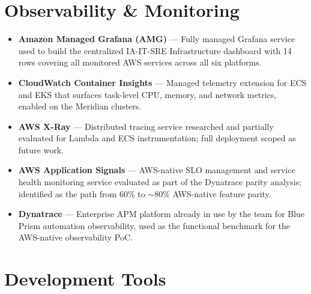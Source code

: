 \section{Observability \& Monitoring}
\label{sec:tools_observability}

\begin{itemize}

    \item \textbf{Amazon Managed Grafana (AMG)} --- Fully managed
          Grafana service used to build the centralized IA-IT-SRE
          Infrastructure dashboard with 14 rows covering all monitored
          AWS services across all six platforms.

    \item \textbf{CloudWatch Container Insights} --- Managed telemetry
          extension for ECS and EKS that surfaces task-level CPU,
          memory, and network metrics, enabled on the Meridian clusters.

    \item \textbf{AWS X-Ray} --- Distributed tracing service researched
          and partially evaluated for Lambda and ECS instrumentation;
          full deployment scoped as future work.

    \item \textbf{AWS Application Signals} --- AWS-native SLO management
          and service health monitoring service evaluated as part of the
          Dynatrace parity analysis; identified as the path from 60\%
          to $\sim$80\% AWS-native feature parity.

    \item \textbf{Dynatrace} --- Enterprise APM platform already in use
          by the team for Blue Prism automation observability, used as the
          functional benchmark for the AWS-native observability PoC.

\end{itemize}

\section{Development Tools}
\label{sec:tools_dev}

